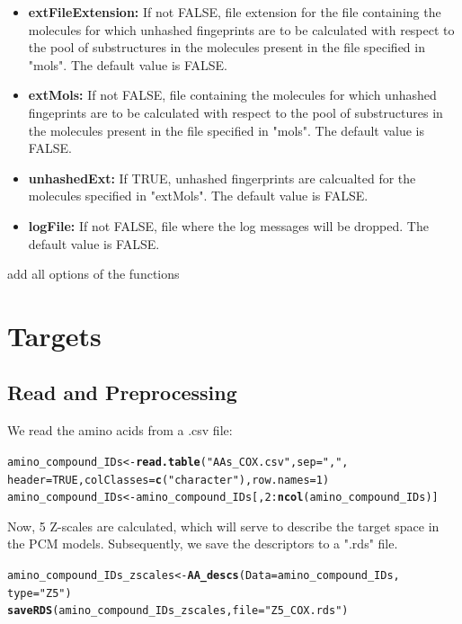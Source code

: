 \documentclass[twoside,a4wide,12pt]{article}\usepackage[]{graphicx}\usepackage[]{color}
\makeatletter
\newcommand{\hlnum}[1]{\textcolor[rgb]{0.686,0.059,0.569}{#1}}%
\newcommand{\hlstr}[1]{\textcolor[rgb]{0.192,0.494,0.8}{#1}}%
\newcommand{\hlopt}[1]{\textcolor[rgb]{0,0,0}{#1}}%
\newcommand{\hlstd}[1]{\textcolor[rgb]{0.345,0.345,0.345}{#1}}%
\newcommand{\hlkwb}[1]{\textcolor[rgb]{0.69,0.353,0.396}{#1}}%
\newcommand{\hlkwc}[1]{\textcolor[rgb]{0.333,0.667,0.333}{#1}}%
\newcommand{\hlkwd}[1]{\textcolor[rgb]{0.737,0.353,0.396}{\textbf{#1}}}%
\newenvironment{kframe}{%
 \def\at@end@of@kframe{}%
 \ifinner\ifhmode%
  \def\at@end@of@kframe{\end{minipage}}%
  \begin{minipage}{\columnwidth}%
 \fi\fi%
 \def\FrameCommand##1{\hskip\@totalleftmargin \hskip-\fboxsep
 \colorbox{shadecolor}{##1}\hskip-\fboxsep
     \hskip-\linewidth \hskip-\@totalleftmargin \hskip\columnwidth}%
 \MakeFramed {\advance\hsize-\width
   \@totalleftmargin\z@ \linewidth\hsize
   \@setminipage}}%
 {\par\unskip\endMakeFramed%
 \at@end@of@kframe}
\newenvironment{knitrout}{}{} %
\makeatother
\begin{document}
\begin{itemize}
\item {\bf extFileExtension:} If not FALSE, file extension for the file containing the molecules for which unhashed fingeprints are to be calculated with respect to the pool of substructures in the molecules present in the file specified in "mols". The default value is FALSE.
\item {\bf extMols:} If not FALSE, file containing the molecules for which unhashed fingeprints are to be calculated with respect to the pool of
substructures in the molecules present in the file specified in "mols". The default value is FALSE.
\item {\bf unhashedExt:} If TRUE, unhashed fingerprints are calcualted for the molecules specified in "extMols". The default value is FALSE.
\item {\bf logFile:} If not FALSE, file where the log messages will be dropped. The default value is FALSE.
\end{itemize}

add all options of the functions

\section{Targets}

\subsection{Read and Preprocessing}
We read the amino acids from a .csv file:
\begin{knitrout}
\color{fgcolor}\begin{kframe}
\begin{alltt}
\hlstd{amino_compound_IDs} \hlkwb{<-} \hlkwd{read.table}\hlstd{(}\hlstr{"AAs_COX.csv"}\hlstd{,} \hlkwc{sep} \hlstd{=} \hlstr{","}\hlstd{,}
    \hlkwc{header} \hlstd{=} \hlnum{TRUE}\hlstd{,} \hlkwc{colClasses} \hlstd{=} \hlkwd{c}\hlstd{(}\hlstr{"character"}\hlstd{),} \hlkwc{row.names} \hlstd{=} \hlnum{1}\hlstd{)}
\hlstd{amino_compound_IDs} \hlkwb{<-} \hlstd{amino_compound_IDs[,} \hlnum{2}\hlopt{:}\hlkwd{ncol}\hlstd{(amino_compound_IDs)]}
\end{alltt}
\end{kframe}
\end{knitrout}

Now, 5 Z-scales are calculated, which will serve to describe the target space in the PCM models.
Subsequently, we save the descriptors to a ".rds" file.
\begin{knitrout}
\color{fgcolor}\begin{kframe}
\begin{alltt}
\hlstd{amino_compound_IDs_zscales} \hlkwb{<-} \hlkwd{AA_descs}\hlstd{(}\hlkwc{Data} \hlstd{= amino_compound_IDs,}
    \hlkwc{type} \hlstd{=} \hlstr{"Z5"}\hlstd{)}
\hlkwd{saveRDS}\hlstd{(amino_compound_IDs_zscales,} \hlkwc{file} \hlstd{=} \hlstr{"Z5_COX.rds"}\hlstd{)}
\end{alltt}
\end{kframe}
\end{knitrout}
\end{document}
